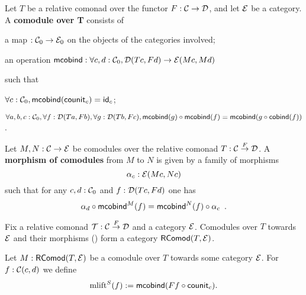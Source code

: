 \documentclass{amsart}
\newcommand{\fat}[1]{\textbf{#1}}
\begin{document}
\begin{definition}
 Let $T$ be a relative comonad over the functor $F:\C\to\D$, and let $\E$ be a category.
 A \fat{comodule over T} consists of
   \begin{packitem}
   \item a map $:\C_0 \to \E_0$ on the objects of the categories involved;
   \item an operation $\mcobind: \forall c,d:\C_0, \D(Tc,Fd) \to \E(Mc,Md)$
  \end{packitem}
  such that 
  \begin{packitem}
   \item $\forall c : \C_0, \mcobind(\counit_c) = \id_c$;
   \item $\forall a,b,c:\C_0, \forall f : \D(Ta,Fb),\forall g:\D(Tb,Fc), \\
        \comp{\mcobind(f)}{\mcobind(g)} = \mcobind(\comp{\cobind(f)}{g})$ .
  \end{packitem}

\end{definition}

\begin{definition}\label{def:morphism_of_comodules}
 
 Let $M, N : \C \to \E$ be comodules over the relative comonad $T : \C \stackrel{F}{\to} \D$.
 A \fat{morphism of comodules} from $M$ to $N$ is given by a family of morphisms 
   \[ \alpha_c:\E(Mc,Nc) \]
 such that for any $c,d:\C_0$ and $f : \D(Tc,Fd)$ one has
 \[   \comp{\mcobind^M(f)}{\alpha_d} = \comp{\alpha_c}{\mcobind^N(f)} \enspace . \]
 
\end{definition}

\begin{remark}
 Fix a relative comonad $\T : \C\stackrel{F}{\to}\D$ and a category $\E$.
 Comodules over $T$ towards $\E$ and their morphisms () form a category $\RComod(T,\E)$.
\end{remark}


\begin{definition}
 Let $M : \RComod(T,\E)$ be a comodule over $T$ towards some category $\E$. For $f : \C(c,d)$ we define
  \[ \mlift^S(f) := \mcobind(\comp{\counit_c}{Ff}) .  \]
\end{definition}
\end{document}
